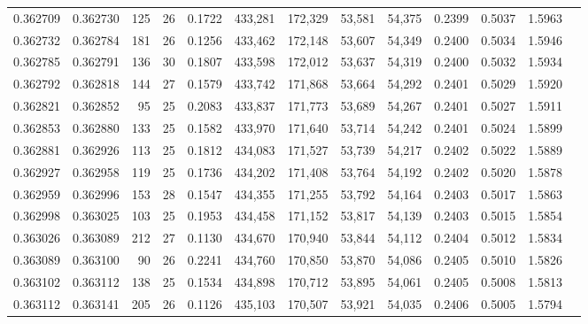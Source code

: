 \begin{tabular}{rrrrrrrrrrrrr}
0.362709 & 0.362730 &   125 &  26 &                                     0.1722 & 433,281 & 172,329 &  53,581 &  54,375 & 0.2399 & 0.5037 & 1.5963 \\
0.362732 & 0.362784 &   181 &  26 &                                     0.1256 & 433,462 & 172,148 &  53,607 &  54,349 & 0.2400 & 0.5034 & 1.5946 \\
0.362785 & 0.362791 &   136 &  30 &                                     0.1807 & 433,598 & 172,012 &  53,637 &  54,319 & 0.2400 & 0.5032 & 1.5934 \\
0.362792 & 0.362818 &   144 &  27 &                                     0.1579 & 433,742 & 171,868 &  53,664 &  54,292 & 0.2401 & 0.5029 & 1.5920 \\
0.362821 & 0.362852 &    95 &  25 &                                     0.2083 & 433,837 & 171,773 &  53,689 &  54,267 & 0.2401 & 0.5027 & 1.5911 \\
0.362853 & 0.362880 &   133 &  25 &                                     0.1582 & 433,970 & 171,640 &  53,714 &  54,242 & 0.2401 & 0.5024 & 1.5899 \\
0.362881 & 0.362926 &   113 &  25 &                                     0.1812 & 434,083 & 171,527 &  53,739 &  54,217 & 0.2402 & 0.5022 & 1.5889 \\
0.362927 & 0.362958 &   119 &  25 &                                     0.1736 & 434,202 & 171,408 &  53,764 &  54,192 & 0.2402 & 0.5020 & 1.5878 \\
0.362959 & 0.362996 &   153 &  28 &                                     0.1547 & 434,355 & 171,255 &  53,792 &  54,164 & 0.2403 & 0.5017 & 1.5863 \\
0.362998 & 0.363025 &   103 &  25 &                                     0.1953 & 434,458 & 171,152 &  53,817 &  54,139 & 0.2403 & 0.5015 & 1.5854 \\
0.363026 & 0.363089 &   212 &  27 &                                     0.1130 & 434,670 & 170,940 &  53,844 &  54,112 & 0.2404 & 0.5012 & 1.5834 \\
0.363089 & 0.363100 &    90 &  26 &                                     0.2241 & 434,760 & 170,850 &  53,870 &  54,086 & 0.2405 & 0.5010 & 1.5826 \\
0.363102 & 0.363112 &   138 &  25 &                                     0.1534 & 434,898 & 170,712 &  53,895 &  54,061 & 0.2405 & 0.5008 & 1.5813 \\
0.363112 & 0.363141 &   205 &  26 &                                     0.1126 & 435,103 & 170,507 &  53,921 &  54,035 & 0.2406 & 0.5005 & 1.5794 \\

\end{tabular}
